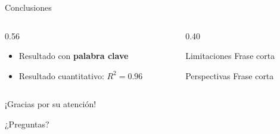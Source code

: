 \documentclass[aspectratio=169,11pt]{beamer}
\begin{document}
\begin{frame}{Conclusiones}
  \begin{columns}[T,onlytextwidth]
    \begin{column}{0.56\textwidth}
      \begin{itemize}\setlength{\itemsep}{0.7em}
        \item Resultado con \textbf{palabra clave}
        \item Resultado cuantitativo: $R^2 = 0.96$
      \end{itemize}
    \end{column}
    \begin{column}{0.40\textwidth}
      \begin{block}{Limitaciones}
        \small Frase corta
      \end{block}
      \vspace{0.4em}
      \begin{block}{Perspectivas}
        \small Frase corta
      \end{block}
    \end{column}
  \end{columns}
\end{frame}

\begin{frame}{¡Gracias por su atención!}
  \vfill
  \begin{block}{}
    \centering
    \Large ¿Preguntas?
  \end{block}
  \vfill
\end{frame}
\end{document}
